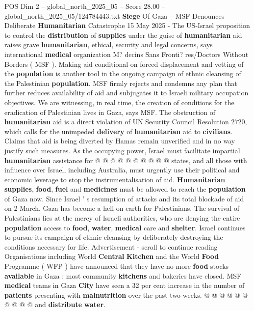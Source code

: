 \begin{textsample}{POS Dim 2 – global\_north\_2025\_05 – Score 28.00 – global\_north\_2025\_05/124784443.txt}  \label{ex:f2_pos_215}
\textbf{Siege} Of Gaza -- MSF Denounces Deliberate \textbf{Humanitarian} Catastrophe 15 May 2025 - The US-Israel proposition to control the \textbf{distribution} of \textbf{supplies} under the guise of \textbf{humanitarian} aid raises grave \textbf{humanitarian}, ethical, security and legal concerns, says international \textbf{medical} organization M? decins Sans Fronti? res/Doctors Without Borders ( MSF ).
Making aid conditional on forced displacement and vetting of the \textbf{population} is another tool in the ongoing campaign of ethnic cleansing of the Palestinian \textbf{population}.
MSF firmly rejects and condemns any plan that further reduces availability of aid and subjugates it to Israeli military occupation objectives.
We are witnessing, in real time, the creation of conditions for the eradication of Palestinian lives in Gaza, says MSF.
The obstruction of \textbf{humanitarian} aid is a direct violation of UN Security Council Resolution 2720, which calls for the unimpeded \textbf{delivery} of \textbf{humanitarian} aid to \textbf{civilians}.
Claims that aid is being diverted by Hamas remain unverified and in no way justify such measures.
As the occupying power, Israel must facilitate impartial \textbf{humanitarian} assistance for @ @ @ @ @ @ @ @ @ @ states, and all those with influence over Israel, including Australia, must urgently use their political and economic leverage to stop the instrumentalisation of aid. \textbf{Humanitarian} \textbf{supplies}, \textbf{food}, \textbf{fuel} and \textbf{medicines} must be allowed to reach the \textbf{population} of Gaza now.
Since Israel ' s resumption of attacks and its total blockade of aid on 2 March, Gaza has become a hell on earth for Palestinians.
The survival of Palestinians lies at the mercy of Israeli authorities, who are denying the entire \textbf{population} access to \textbf{food}, \textbf{water}, \textbf{medical} care and \textbf{shelter}.
Israel continues to pursue its campaign of ethnic cleansing by deliberately destroying the conditions necessary for life.
Advertisement - scroll to continue reading Organisations including World \textbf{Central} \textbf{Kitchen} and the World \textbf{Food} Programme ( WFP ) have announced that they have no more \textbf{food} stocks \textbf{available} in Gaza : most community \textbf{kitchens} and bakeries have closed.
MSF \textbf{medical} teams in Gaza \textbf{City} have seen a 32 per cent increase in the number of \textbf{patients} presenting with \textbf{malnutrition} over the past two weeks. @ @ @ @ @ @ @ @ @ @ and \textbf{distribute} \textbf{water}.

\end{textsample}
